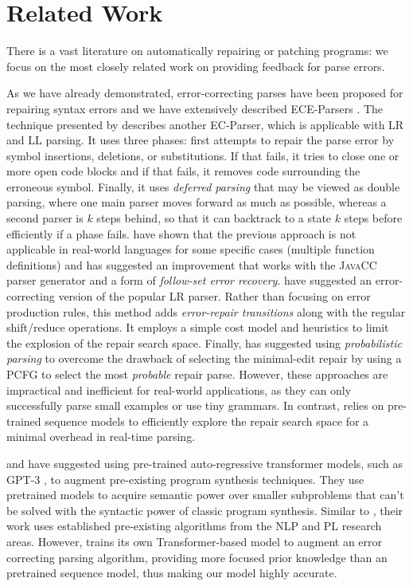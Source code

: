 \section{Related Work}
\label{sec:related-work}

There is a vast literature on automatically repairing or patching programs:
we focus on the most closely related work on providing feedback for parse
errors.

%
As we have already demonstrated, error-correcting parses have been proposed for
repairing syntax errors and we have extensively described ECE-Parsers
\citep{Aho_1972}. The technique presented by \citet{Burke1987} describes another
EC-Parser, which is applicable with LR and LL parsing. It uses three phases:
first attempts to repair the parse error by symbol insertions, deletions, or
substitutions. If that fails, it tries to close one or more open code blocks and if
that fails, it removes code surrounding the erroneous symbol. Finally, it uses
\emph{deferred parsing} that may be viewed as double parsing, where one main
parser moves forward as much as possible, whereas a second parser is $k$ steps
behind, so that it can backtrack to a state $k$ steps before efficiently if a
phase fails. \citet{VanDerSpek_2005} have shown that the previous approach is not
applicable in real-world languages for some specific cases (\eg multiple
function definitions) and has suggested an improvement that works with the
\textsc{JavaCC} parser generator and a form of \emph{follow-set error recovery}.
\citet{Corchuelo2002} have suggested an error-correcting version of the popular
LR parser. Rather than focusing on error production rules, this method adds
\emph{error-repair transitions} along with the regular shift/reduce operations.
It employs a simple cost model and heuristics to limit the explosion of the
repair search space. Finally, \citet{Thompson1976} has suggested using
\emph{probabilistic parsing} to overcome the drawback of selecting the
minimal-edit repair by using a PCFG to select the most \emph{probable} repair
parse. However, these approaches are impractical and inefficient for real-world
applications, as they can only successfully parse small examples or use tiny
grammars. In contrast, \toolname relies on pre-trained sequence models to
efficiently explore the repair search space for a minimal overhead in real-time
parsing.

%
\citet{Rahmani2021} and \citet{Verbruggen2021} have suggested using pre-trained
auto-regressive transformer models, such as \textsc{GPT-3} \citep{GPT2020}, to
augment pre-existing program synthesis techniques. They use pretrained models to
acquire semantic power over smaller subproblems that can't be solved with the
syntactic power of classic program synthesis. Similar to \toolname, their work
uses established pre-existing algorithms from the NLP and PL research areas.
However, \toolname trains its own Transformer-based model to augment an error
correcting parsing algorithm, providing more focused prior knowledge than an
pretrained sequence model, thus making our model highly accurate.

